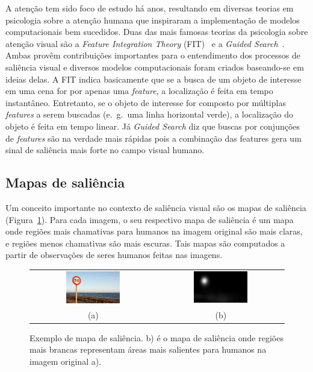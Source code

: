 \documentclass[11pt]{article}
\newcommand{\tit}[1]{\textit{#1}}
\newcommand{\eg}{e.~g.~}
\begin{document}
A atenção tem sido foco de estudo há anos, resultando em diversas teorias
em psicologia sobre a atenção humana que inspiraram a implementação de
modelos computacionais bem sucedidos.
Duas das mais famosas teorias da psicologia sobre atenção visual
são a \tit{Feature Integration Theory} (FIT)~\cite{TreismanGelade1980} e a
\tit{Guided Search}~\cite{Wolfe1989}.
Ambas provêm contribuições importantes para o entendimento dos processos
de saliência visual
e diversos modelos computacionais foram criados baseando-se em ideias delas.
A FIT indica basicamente que se a busca de um objeto de interesse em uma
cena for por apenas uma \tit{feature}, a localização é feita em tempo
instantâneo.
Entretanto, se o objeto de interesse for composto por múltiplas \tit{features}
a serem buscadas (\eg uma linha horizontal verde),
a localização do objeto é feita em tempo linear.
Já \tit{Guided Search} diz que buscas por conjunções de \tit{features} são na
verdade mais rápidas pois a combinação das features gera um sinal de
saliência mais forte no campo visual humano.

\subsection{Mapas de saliência}
Um conceito importante no contexto de saliência visual são os mapas
de saliência (Figura~\ref{fig:salmap}).
Para cada imagem, o seu respectivo mapa de saliência é um mapa onde
regiões mais chamativas para humanos na imagem original são mais claras,
e regiões menos chamativas são mais escuras.
Tais mapas são computados a partir de observações de seres humanos feitas
nas imagens.

\begin{figure}[H]
\begin{center}
		\begin{tabular} {cc}
		\includegraphics[width=0.45\textwidth]{./img/traffic_sign_s.jpg} &
		\includegraphics[width=0.45\textwidth]{./img/traffic_sign_m.jpg}\\
        (a) & (b)
		\end{tabular}
\end{center}
\caption{Exemplo de mapa de saliência. b) é o mapa de saliência onde 
    regiões mais brancas representam áreas
    mais salientes para humanos na imagem original a).}
\label{fig:salmap}
\end{figure}
\end{document}
